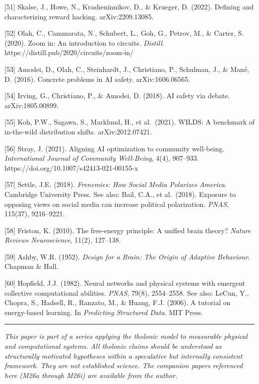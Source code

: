 \documentclass[
  11pt,
  letterpaper,
]{article}
\begin{document}
{[}51{]} Skalse, J., Howe, N., Krasheninnikov, D., \& Krueger, D.
(2022). Defining and characterizing reward hacking. arXiv:2209.13085.

{[}52{]} Olah, C., Cammarata, N., Schubert, L., Goh, G., Petrov, M., \&
Carter, S. (2020). Zoom in: An introduction to circuits. \emph{Distill}.
https://distill.pub/2020/circuits/zoom-in/

{[}53{]} Amodei, D., Olah, C., Steinhardt, J., Christiano, P., Schulman,
J., \& Mané, D. (2016). Concrete problems in AI safety.
arXiv:1606.06565.

{[}54{]} Irving, G., Christiano, P., \& Amodei, D. (2018). AI safety via
debate. arXiv:1805.00899.

{[}55{]} Koh, P.W., Sagawa, S., Marklund, H., et al.~(2021). WILDS: A
benchmark of in-the-wild distribution shifts. arXiv:2012.07421.

{[}56{]} Stray, J. (2021). Aligning AI optimization to community
well-being. \emph{International Journal of Community Well-Being}, 4(4),
907--933. https://doi.org/10.1007/s42413-021-00155-x

{[}57{]} Settle, J.E. (2018). \emph{Frenemies: How Social Media
Polarizes America}. Cambridge University Press. See also: Bail, C.A., et
al.~(2018). Exposure to opposing views on social media can increase
political polarization. \emph{PNAS}, 115(37), 9216--9221.

{[}58{]} Friston, K. (2010). The free-energy principle: A unified brain
theory? \emph{Nature Reviews Neuroscience}, 11(2), 127--138.

{[}59{]} Ashby, W.R. (1952). \emph{Design for a Brain: The Origin of
Adaptive Behaviour}. Chapman \& Hall.

{[}60{]} Hopfield, J.J. (1982). Neural networks and physical systems
with emergent collective computational abilities. \emph{PNAS}, 79(8),
2554--2558. See also: LeCun, Y., Chopra, S., Hadsell, R., Ranzato, M.,
\& Huang, F.J. (2006). A tutorial on energy-based learning. In
\emph{Predicting Structured Data}. MIT Press.

\begin{center}\rule{0.5\linewidth}{0.5pt}\end{center}

\emph{This paper is part of a series applying the tholonic model to
measurable physical and computational systems. All tholonic claims
should be understood as structurally motivated hypotheses within a
speculative but internally consistent framework. They are not
established science. The companion papers referenced here (M26a through
M26i) are available from the author.}
\end{document}
